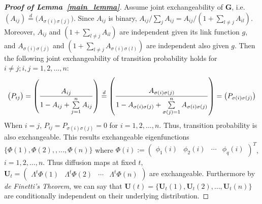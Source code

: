 \documentclass[11pt]{article}
\theoremstyle{definition}
\begin{document}
\begin{proof}[\textbf{Proof of Lemma~\ref{main_lemma}}]
	Assume joint exchangeability of $\mathbf{G}$, i.e. $(A_{ij}) \stackrel{d}{=} \big( A_{\sigma(i) \sigma(j)} \big)$. Since $A_{ij}$ is binary, $A_{ij} / \sum\limits_{j} A_{ij} = A_{ij} /  (1 + \sum\limits_{l \neq j} A_{il})$. Moreover, $A_{ij}$ and $(1 + \sum\limits_{l \neq j} A_{il})$ are independent given its link function $g$, and $A_{\sigma(i) \sigma(j)}$ and $(1 + \sum\limits_{l \neq j} A_{\sigma(i) \sigma(l)})$ are independent also given $g$. Then the following joint exchangeability of transition probability holds for $i \neq j; i,j = 1,2, \ldots,n$:	
	\begin{equation}
		\vspace*{-0.2cm}
	\big( P_{ij} \big) = \left(  \frac{A_{ij}}{1 - A_{ij} + \sum\limits_{j=1}^{n} A_{ij} } \right)  \stackrel{d}{=} \left( \frac{A_{\sigma(i) \sigma(j)} }{1 - A_{\sigma(i) \sigma(j)} + \sum\limits_{\sigma(j) = 1}^{n} A_{\sigma(i) \sigma(j)} } \right) = \big( P_{\sigma(i) \sigma(j)} \big)
	\end{equation}
	When $i = j$, $P_{ij} = P_{\sigma(i) \sigma(j)} = 0$ for $i=1,2, \ldots, n$. Thus, transition probability is also exchangeable. This results exchangeable eigenfunctions $\{ \Phi(1), \Phi(2), , ... , \Phi(n) \}$ where $\Phi(i) := \begin{pmatrix} \phi_{1}(i) & \phi_{2}(i) & \cdots & \phi_{q}(i) \end{pmatrix}^{T}$, $i=1,2, \ldots, n$. Thus diffusion maps at fixed $t$, $\mathbf{U}_{t} = \begin{pmatrix} \Lambda^{t} \Phi(1)  & \Lambda^{t} \Phi(2) & \cdots & \Lambda^{t} \Phi(n)  \end{pmatrix}$ are exchangeable. Furthermore by \textit{de Finetti's Theorem}, we can say that $\mathbf{U}(t) = \{ \mathbf{U}_{t}(1), \mathbf{U}_{t}(2), \ldots, \mathbf{U}_{t}(n)    \}$ are conditionally independent on their underlying distribution.
\end{proof}
\end{document}
